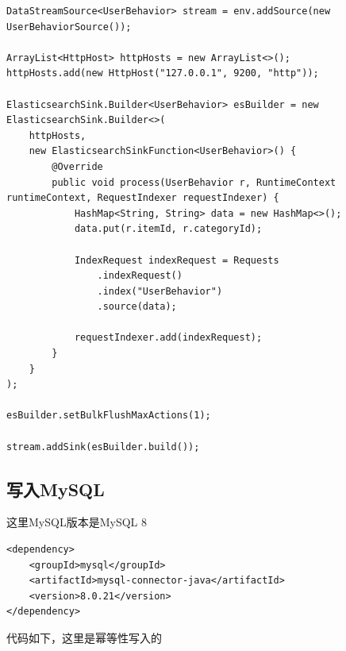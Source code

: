 \documentclass[cn,11pt,chinese]{elegantbook}
\begin{document}
\begin{verbatim}
DataStreamSource<UserBehavior> stream = env.addSource(new UserBehaviorSource());

ArrayList<HttpHost> httpHosts = new ArrayList<>();
httpHosts.add(new HttpHost("127.0.0.1", 9200, "http"));

ElasticsearchSink.Builder<UserBehavior> esBuilder = new ElasticsearchSink.Builder<>(
    httpHosts,
    new ElasticsearchSinkFunction<UserBehavior>() {
        @Override
        public void process(UserBehavior r, RuntimeContext runtimeContext, RequestIndexer requestIndexer) {
            HashMap<String, String> data = new HashMap<>();
            data.put(r.itemId, r.categoryId);
        
            IndexRequest indexRequest = Requests
                .indexRequest()
                .index("UserBehavior")
                .source(data);
        
            requestIndexer.add(indexRequest);
        }
    }
);

esBuilder.setBulkFlushMaxActions(1);

stream.addSink(esBuilder.build());
\end{verbatim}

\subsection{写入MySQL}

这里MySQL版本是MySQL 8

\begin{verbatim}
<dependency>
    <groupId>mysql</groupId>
    <artifactId>mysql-connector-java</artifactId>
    <version>8.0.21</version>
</dependency>
\end{verbatim}

代码如下，这里是幂等性写入的
\end{document}
